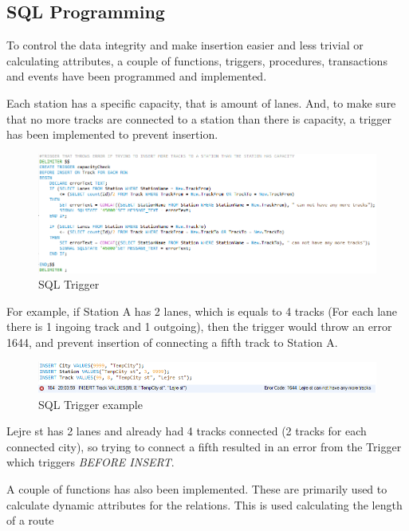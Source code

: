 \newpage
\subsection{SQL Programming} \label{sec:sql:programming}
To control the data integrity and make insertion easier and less trivial or 
calculating attributes, a couple of functions, triggers, procedures, 
transactions and events have been programmed and implemented.

Each station has a specific capacity, that is amount of lanes. And, to make 
sure that no more tracks are connected to a station than there is capacity, a 
trigger has been implemented to prevent insertion.

\begin{figure}[ht!]
    \centering
    \includegraphics[width=1\textwidth]{img/SQL_TRIGGER}
    \caption{SQL Trigger}
\end{figure}

For example, if Station A has 2 lanes, which is equals to 4 tracks (For each 
lane there is 1 ingoing track and 1 outgoing), then the trigger would throw an 
error 1644, and prevent insertion of connecting a fifth track to Station A.

\begin{figure}[ht!]
    \centering
    \includegraphics[width=1\textwidth]{img/SQL_TRIGGER_example}
    \caption{SQL Trigger example}
\end{figure}

Lejre st has 2 lanes and already had 4 tracks connected (2 tracks for each 
connected city), so trying to connect a fifth resulted in an error from the 
Trigger which triggers \emph{BEFORE INSERT}.

A couple of functions has also been implemented. These are primarily used to 
calculate dynamic attributes for the relations.
This is used calculating the length of a route

